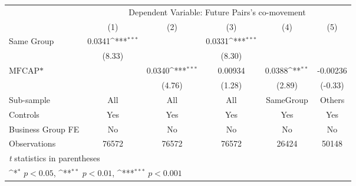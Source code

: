 {
\def\sym#1{\ifmmode^{#1}\else\(^{#1}\)\fi}
\begin{tabular}{l*{5}{c}}
\hline\hline
                &\multicolumn{5}{c}{Dependent Variable:  Future Pairs's co-movement}                           \\\cmidrule(lr){2-6}
                &\multicolumn{1}{c}{(1)}         &\multicolumn{1}{c}{(2)}         &\multicolumn{1}{c}{(3)}         &\multicolumn{1}{c}{(4)}         &\multicolumn{1}{c}{(5)}         \\
\hline
Same Group      &   0.0341\sym{***}&                  &   0.0331\sym{***}&                  &                  \\
                &   (8.33)         &                  &   (8.30)         &                  &                  \\
[1em]
$ \text{MFCAP*} $&                  &   0.0340\sym{***}&  0.00934         &   0.0388\sym{**} & -0.00236         \\
                &                  &   (4.76)         &   (1.28)         &   (2.89)         &  (-0.33)         \\
\hline
Sub-sample      &      All         &      All         &      All         &SameGroup         &   Others         \\
Controls        &      Yes         &      Yes         &      Yes         &      Yes         &      Yes         \\
Business Group FE&       No         &       No         &       No         &       No         &       No         \\
Observations    &    76572         &    76572         &    76572         &    26424         &    50148         \\
\hline\hline
\multicolumn{6}{l}{\footnotesize \textit{t} statistics in parentheses}\\
\multicolumn{6}{l}{\footnotesize \sym{*} \(p<0.05\), \sym{**} \(p<0.01\), \sym{***} \(p<0.001\)}\\
\end{tabular}
}
